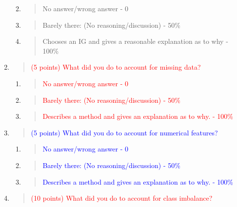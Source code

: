 \documentclass[
]{article}
\begin{document}
\begin{enumerate}
  \begin{enumerate}
  \def\labelenumii{\alph{enumii}.}
  \item
    \begin{quote}
    No answer/wrong answer - 0
    \end{quote}
  \item
    \begin{quote}
    Barely there: (No reasoning/discussion) - 50\%
    \end{quote}
  \item
    \begin{quote}
    Chooses an IG and gives a reasonable explanation as to why - 100\%
    \end{quote}
  \end{enumerate}
\item
  \begin{quote}
  \textcolor{red}{(5 points) What did you do to account for missing data?}
  \end{quote}

  \begin{enumerate}
  \def\labelenumii{\alph{enumii}.}
  \item
    \begin{quote}
    \textcolor{red}{No answer/wrong answer - 0}
    \end{quote}
  \item
    \begin{quote}
    \textcolor{red}{Barely there: (No reasoning/discussion) - 50\%}
    \end{quote}
  \item
    \begin{quote}
    \textcolor{red}{Describes a method and gives an explanation as to why. - 100\%}
    \end{quote}
  \end{enumerate}
\item
  \begin{quote}
  \textcolor{blue}{(5 points) What did you do to account for numerical features?}
  \end{quote}

  \begin{enumerate}
  \def\labelenumii{\alph{enumii}.}
  \item
    \begin{quote}
    \textcolor{blue}{No answer/wrong answer - 0}
    \end{quote}
  \item
    \begin{quote}
    \textcolor{blue}{Barely there: (No reasoning/discussion) - 50\%}
    \end{quote}
  \item
    \begin{quote}
    \textcolor{blue}{Describes a method and gives an explanation as to why. - 100\%}
    \end{quote}
  \end{enumerate}
\item
  \begin{quote}
  \textcolor{red}{(10 points) What did you do to account for class imbalance?}
  \end{quote}


\end{enumerate}
\end{document}
